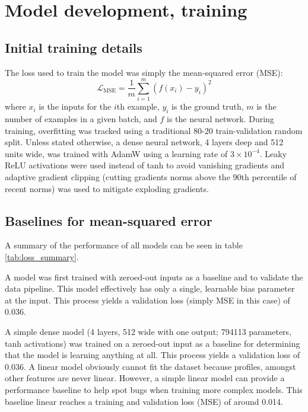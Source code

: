 \section{Model development, training}
\label{sec:model_dev}

\subsection{Initial training details}

The loss used to train the model was simply the mean-squared error (MSE): 
\begin{equation}
	\mathcal{L}_\text{MSE}=\frac{1}{m}\sum_{i=1}^m \left(f\left(x_i\right) - y_i \right)^2
\end{equation} 
where $x_i$ is the inputs for the $i$th example, $y_i$ is the ground truth, $m$ is the number of examples in a given batch, and $f$ is the neural network. During training, overfitting was tracked using a traditional 80-20 train-validation random split. Unless stated otherwise, a dense neural network, 4 layers deep and 512 units wide, was trained with AdamW using a learning rate of $3\times10^{-4}$. Leaky ReLU activations were used instead of tanh to avoid vanishing gradients and adaptive gradient clipping \cite{seetharaman_autoclip_2020} (cutting gradients norms above the 90th percentile of recent norms) was used to mitigate exploding gradients.


\subsection{Baselines for mean-squared error}

A summary of the performance of all models can be seen in table \ref{tab:loss_summary}.

A model was first trained with zeroed-out inputs as a baseline and to validate the data pipeline. This model effectively has only a single, learnable bias parameter at the input. This process yields a validation loss (simply MSE in this case) of 0.036. 


A simple dense model (4 layers, 512 wide with one output; 794113 parameters, tanh activations) was trained on a zeroed-out input as a baseline for determining that the model is learning anything at all. This process yields a validation loss of 0.036. A linear model obviously cannot fit the dataset because profiles, amongst other features are never linear. However, a simple linear model can provide a performance baseline to help spot bugs when training more complex models. This baseline linear reaches a training and validation loss (MSE) of around 0.014.

